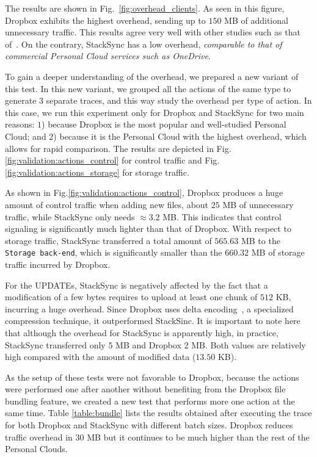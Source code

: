The results are shown in Fig.~\ref{fig:overhead_clients}. As seen in this
figure, Dropbox exhibits the highest overhead, sending up to $150$ MB of additional
unnecessary traffic. This results agree very well with other studies such as that
of~\cite{liu2013}. On the contrary, StackSync has a low overhead, \textit{comparable to that of commercial
Personal Cloud services such as OneDrive}.


To gain a deeper understanding of the overhead, we prepared a new variant of
this test. In this new variant, we grouped all the actions of the same type to generate $3$ separate traces,
and this way study the overhead per type of action. In this case, we run this experiment only for Dropbox and StackSync
for two main reasons: $1$) because 
Dropbox is the most popular and well-studied Personal Cloud; and $2$) because
it is the Personal Cloud with the highest overhead, which allows for rapid comparison. 
The results are depicted in Fig.\ref{fig:validation:actions_control} for control traffic and Fig.\ref{fig:validation:actions_storage}
for storage traffic.

As shown in Fig.\ref{fig:validation:actions_control}, Dropbox produces a huge amount of control traffic
when adding new files, about $25$ MB of unnecessary traffic, while StackSync only needs $\approx 3.2$ MB.
This indicates that control signaling is significantly much lighter than that of Dropbox. With respect
to storage traffic, StackSync transferred a total amount of $565.63$ MB to the \texttt{Storage back-end},
which is significantly smaller than the $660.32$ MB of storage traffic incurred by Dropbox.

For the UPDATEs, StackSync is negatively affected by the fact that a modification of a few bytes requires to upload at 
least one chunk of  $512$ KB, incurring a huge overhead. Since Dropbox uses delta encoding~\cite{drago2013benchmarking}, a specialized
compression technique, it outperformed StackSinc. It is important to note here that although the 
overhead for StackSync is apparently high, in practice, StackSync transferred only $5$ MB and Dropbox $2$ MB. 
Both values are relatively high compared with the amount of  modified data ($13.50$ KB). 

As the setup of these tests were not favorable to Dropbox, because the actions were performed one after
another without benefiting from the Dropbox file bundling feature, we created a new test that
performs more one action at the same time. Table \ref{table:bundle} lists
the results obtained after executing the trace for both Dropbox and StackSync with different
batch sizes. Dropbox reduces traffic overhead in $30$ MB but it continues to be much higher than the
rest of the Personal Clouds.

